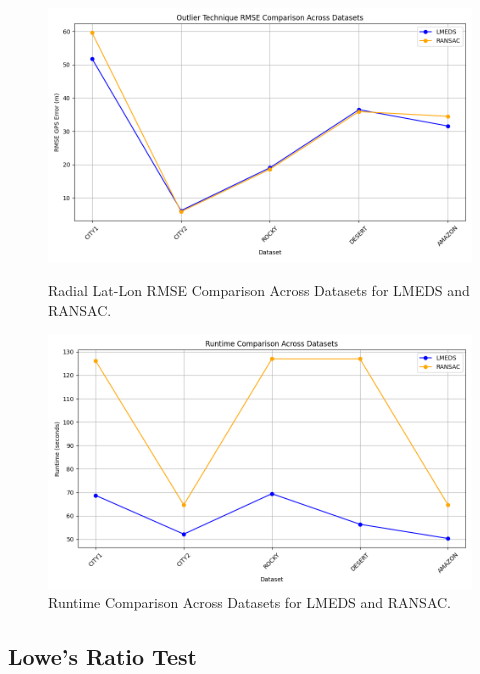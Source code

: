 \begin{figure}[H]
    \centering
    \begin{minipage}{0.45\textwidth}
        \centering
        \includegraphics[width=\textwidth]{./Chapter 4/testresults/ransaclmedsrmse.png}
        \caption{Radial Lat-Lon RMSE Comparison Across Datasets for LMEDS and RANSAC.}
        \label{fig:rmse_comparisonlmeds}
    \end{minipage}\hfill
    \begin{minipage}{0.45\textwidth}
        \centering
        \includegraphics[width=\textwidth]{./Chapter 4/testresults/ransaclmedsruntime.png}
        \caption{Runtime Comparison Across Datasets for LMEDS and RANSAC.}
        \label{fig:runtime_comparisonlmeds}
    \end{minipage}
\end{figure}




\subsection{Lowe's Ratio Test}

